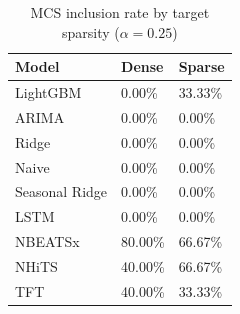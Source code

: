 \begin{table}
\caption{MCS inclusion rate by target sparsity ($\alpha=0.25$)}
\begin{tabular}{lll}
\toprule
Model & Dense & Sparse \\
\midrule
LightGBM & 0.00\% & 33.33\% \\
ARIMA & 0.00\% & 0.00\% \\
Ridge & 0.00\% & 0.00\% \\
Naive & 0.00\% & 0.00\% \\
Seasonal Ridge & 0.00\% & 0.00\% \\
LSTM & 0.00\% & 0.00\% \\
NBEATSx & 80.00\% & 66.67\% \\
NHiTS & 40.00\% & 66.67\% \\
TFT & 40.00\% & 33.33\% \\
\bottomrule
\end{tabular}
\end{table}
